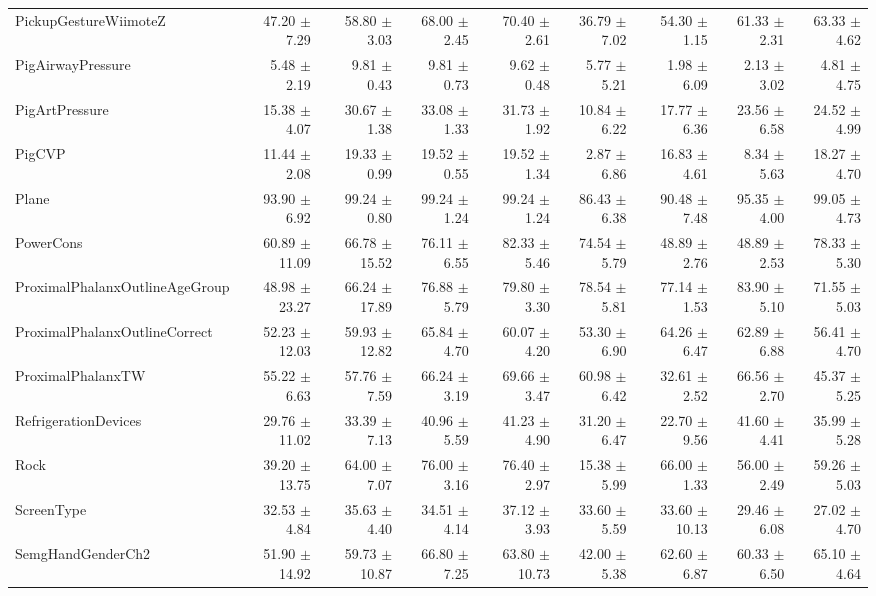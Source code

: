 \begin{landscape}
\begin{longtable}{lrrrrrrrr}
PickupGestureWiimoteZ & 47.20 $\pm$ 7.29 & 58.80 $\pm$ 3.03 & 68.00 $\pm$ 2.45 & 70.40 $\pm$ 2.61 & 36.79 $\pm$ 7.02 & 54.30 $\pm$ 1.15 & 61.33 $\pm$ 2.31 & 63.33 $\pm$ 4.62 \\
PigAirwayPressure & 5.48 $\pm$ 2.19 & 9.81 $\pm$ 0.43 & 9.81 $\pm$ 0.73 & 9.62 $\pm$ 0.48 & 5.77 $\pm$ 5.21 & 1.98 $\pm$ 6.09 & 2.13 $\pm$ 3.02 & 4.81 $\pm$ 4.75 \\
PigArtPressure & 15.38 $\pm$ 4.07 & 30.67 $\pm$ 1.38 & 33.08 $\pm$ 1.33 & 31.73 $\pm$ 1.92 & 10.84 $\pm$ 6.22 & 17.77 $\pm$ 6.36 & 23.56 $\pm$ 6.58 & 24.52 $\pm$ 4.99 \\
PigCVP & 11.44 $\pm$ 2.08 & 19.33 $\pm$ 0.99 & 19.52 $\pm$ 0.55 & 19.52 $\pm$ 1.34 & 2.87 $\pm$ 6.86 & 16.83 $\pm$ 4.61 & 8.34 $\pm$ 5.63 & 18.27 $\pm$ 4.70 \\
Plane & 93.90 $\pm$ 6.92 & 99.24 $\pm$ 0.80 & 99.24 $\pm$ 1.24 & 99.24 $\pm$ 1.24 & 86.43 $\pm$ 6.38 & 90.48 $\pm$ 7.48 & 95.35 $\pm$ 4.00 & 99.05 $\pm$ 4.73 \\
PowerCons & 60.89 $\pm$ 11.09 & 66.78 $\pm$ 15.52 & 76.11 $\pm$ 6.55 & 82.33 $\pm$ 5.46 & 74.54 $\pm$ 5.79 & 48.89 $\pm$ 2.76 & 48.89 $\pm$ 2.53 & 78.33 $\pm$ 5.30 \\
ProximalPhalanxOutlineAgeGroup & 48.98 $\pm$ 23.27 & 66.24 $\pm$ 17.89 & 76.88 $\pm$ 5.79 & 79.80 $\pm$ 3.30 & 78.54 $\pm$ 5.81 & 77.14 $\pm$ 1.53 & 83.90 $\pm$ 5.10 & 71.55 $\pm$ 5.03 \\
ProximalPhalanxOutlineCorrect & 52.23 $\pm$ 12.03 & 59.93 $\pm$ 12.82 & 65.84 $\pm$ 4.70 & 60.07 $\pm$ 4.20 & 53.30 $\pm$ 6.90 & 64.26 $\pm$ 6.47 & 62.89 $\pm$ 6.88 & 56.41 $\pm$ 4.70 \\
ProximalPhalanxTW & 55.22 $\pm$ 6.63 & 57.76 $\pm$ 7.59 & 66.24 $\pm$ 3.19 & 69.66 $\pm$ 3.47 & 60.98 $\pm$ 6.42 & 32.61 $\pm$ 2.52 & 66.56 $\pm$ 2.70 & 45.37 $\pm$ 5.25 \\
RefrigerationDevices & 29.76 $\pm$ 11.02 & 33.39 $\pm$ 7.13 & 40.96 $\pm$ 5.59 & 41.23 $\pm$ 4.90 & 31.20 $\pm$ 6.47 & 22.70 $\pm$ 9.56 & 41.60 $\pm$ 4.41 & 35.99 $\pm$ 5.28 \\
Rock & 39.20 $\pm$ 13.75 & 64.00 $\pm$ 7.07 & 76.00 $\pm$ 3.16 & 76.40 $\pm$ 2.97 & 15.38 $\pm$ 5.99 & 66.00 $\pm$ 1.33 & 56.00 $\pm$ 2.49 & 59.26 $\pm$ 5.03 \\
ScreenType & 32.53 $\pm$ 4.84 & 35.63 $\pm$ 4.40 & 34.51 $\pm$ 4.14 & 37.12 $\pm$ 3.93 & 33.60 $\pm$ 5.59 & 33.60 $\pm$ 10.13 & 29.46 $\pm$ 6.08 & 27.02 $\pm$ 4.70 \\
SemgHandGenderCh2 & 51.90 $\pm$ 14.92 & 59.73 $\pm$ 10.87 & 66.80 $\pm$ 7.25 & 63.80 $\pm$ 10.73 & 42.00 $\pm$ 5.38 & 62.60 $\pm$ 6.87 & 60.33 $\pm$ 6.50 & 65.10 $\pm$ 4.64 \\

\end{longtable}
\end{landscape}
